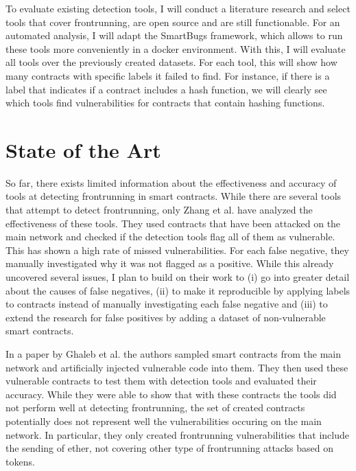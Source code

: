 \documentclass[paper=a4,fontsize=11pt,oneside,titlepage]{scrartcl}
\begin{document}
To evaluate existing detection tools, I will conduct a literature research and select tools that cover frontrunning, are open source and are still functionable. For an automated analysis, I will adapt the SmartBugs framework\cite{di_angelo_smartbugs_2023}, which allows to run these tools more conveniently in a docker environment. With this, I will evaluate all tools over the previously created datasets. For each tool, this will show how many contracts with specific labels it failed to find. For instance, if there is a label that indicates if a contract includes a hash function, we will clearly see which tools find vulnerabilities for contracts that contain hashing functions.


\iffalse
\begin{itemize}
\item How will the goals and results of \autoref{sec:results} be addressed and achieved?
\item What working directions/methods will be used and investigated?
\item How do you plan to validate/evaluate your results?
\end{itemize}
\fi

\section{State of the Art}
\label{sec:relatedWork}

So far, there exists limited information about the effectiveness and accuracy of tools at detecting frontrunning in smart contracts. While there are several tools that attempt to detect frontrunning, only Zhang et al. \cite{zhang_combatting_2023} have analyzed the effectiveness of these tools. They used contracts that have been attacked on the main network and checked if the detection tools flag all of them as vulnerable. This has shown a high rate of missed vulnerabilities. For each false negative, they manually investigated why it was not flagged as a positive. While this already uncovered several issues, I plan to build on their work to (i) go into greater detail about the causes of false negatives, (ii) to make it reproducible by applying labels to contracts instead of manually investigating each false negative and (iii) to extend the research for false positives by adding a dataset of non-vulnerable smart contracts.

In a paper by Ghaleb et al.\cite{ghaleb_how_2020} the authors sampled smart contracts from the main network and artificially injected vulnerable code into them. They then used these vulnerable contracts to test them with detection tools and evaluated their accuracy. While they were able to show that with these contracts the tools did not perform well at detecting frontrunning, the set of created contracts potentially does not represent well the vulnerabilities occuring on the main network. In particular, they only created frontrunning vulnerabilities that include the sending of ether, not covering other type of frontrunning attacks based on tokens.
\end{document}
